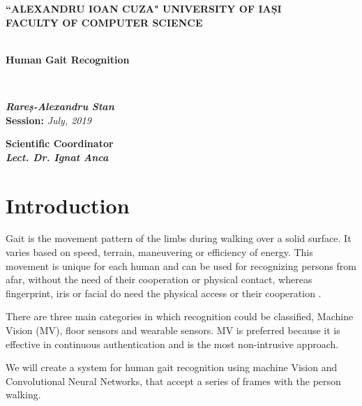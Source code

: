 \documentclass[12pt]{article}
\theoremstyle{definition}
\begin{document}
	\begin{titlepage}
		\begin{center}
			\textbf{``ALEXANDRU IOAN CUZA" UNIVERSITY OF IAȘI}
			\
			\\
			\textbf{FACULTY OF COMPUTER SCIENCE}\\
			\vspace{6cm}
			\
			\\
			\begin{huge}
				\textbf{Human Gait Recognition}
			\end{huge}
			\\
			\begin{large}
				\vspace{3cm}
				\textit{\textbf{Rareș-Alexandru Stan}}
				\\
				\vspace{3cm}
				\textbf{Session:} \textit{July, 2019}
				\\
			\end{large}
			\vspace{3cm}
			\textbf{Scientific Coordinator}
			\
			\\
			\textit{\textbf{Lect. Dr. Ignat Anca}	}
		\end{center}
	\end{titlepage}
	\newpage
	\tableofcontents
	\newpage
	
	\section{Introduction}
	\vspace{1cm}
	
	Gait is the movement pattern of the limbs during walking over a solid surface. It varies based on speed, terrain, maneuvering or efficiency of energy. This movement is unique for each human and can be used for recognizing persons from afar, without the need of their cooperation or physical contact, whereas fingerprint, iris or facial do need the physical access or their cooperation \cite{biometrics-comparison}.
	
	There are three main categories in which recognition could be classified, Machine Vision (MV), floor sensors and wearable sensors. MV is preferred because it is effective in continuous authentication and is the most non-intrusive approach.
	
	We will create a system for human gait recognition using machine Vision and Convolutional Neural Networks, that accept a series of frames with the person walking.
	
\end{document}
